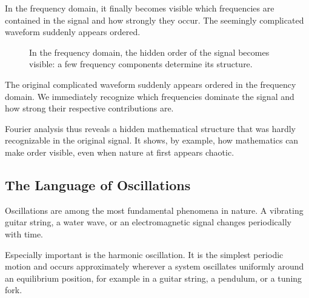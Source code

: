 In the frequency domain, it finally becomes visible
which frequencies are contained in the signal
and how strongly they occur.
The seemingly complicated waveform suddenly appears ordered.

\FloatBarrier
\begin{figure}[h]
	\centering
	\caption{In the frequency domain, the hidden order of the signal becomes visible: a few frequency components determine its structure.}
	\label{fig:frequenzspektrum}
\end{figure}
\newpage
\noindent
The original complicated waveform suddenly appears ordered
in the frequency domain.
We immediately recognize
which frequencies dominate the signal
and how strong their respective contributions are.

Fourier analysis thus reveals a hidden mathematical structure
that was hardly recognizable in the original signal.
It shows, by example,
how mathematics can make order visible,
even when nature at first appears chaotic.

\subsection{The Language of Oscillations}

Oscillations are among the most fundamental phenomena in nature.
A vibrating guitar string,
a water wave,
or an electromagnetic signal
changes periodically with time.

Especially important is the harmonic oscillation.
It is the simplest periodic motion
and occurs approximately wherever a system oscillates uniformly around an equilibrium position,
for example in a guitar string,
a pendulum,
or a tuning fork.

